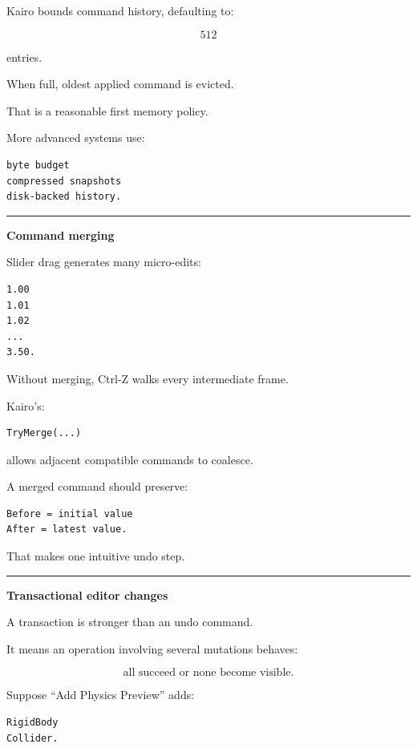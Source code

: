 Kairo bounds command history, defaulting to:

\[
512
\]

entries.

When full, oldest applied command is evicted.

That is a reasonable first memory policy.

More advanced systems use:

\begin{verbatim}
byte budget
compressed snapshots
disk-backed history.
\end{verbatim}

\begin{center}\rule{0.5\linewidth}{0.5pt}\end{center}

\textbf{Command merging}

Slider drag generates many micro-edits:

\begin{verbatim}
1.00
1.01
1.02
...
3.50.
\end{verbatim}

Without merging, Ctrl-Z walks every intermediate frame.

Kairo's:

\begin{verbatim}
TryMerge(...)
\end{verbatim}

allows adjacent compatible commands to coalesce.

A merged command should preserve:

\begin{verbatim}
Before = initial value
After = latest value.
\end{verbatim}

That makes one intuitive undo step.

\begin{center}\rule{0.5\linewidth}{0.5pt}\end{center}

\textbf{Transactional editor changes}

A transaction is stronger than an undo command.

It means an operation involving several mutations behaves:

\[
\boxed{
\text{all succeed or none become visible}.
}
\]

Suppose ``Add Physics Preview'' adds:

\begin{verbatim}
RigidBody
Collider.
\end{verbatim}

